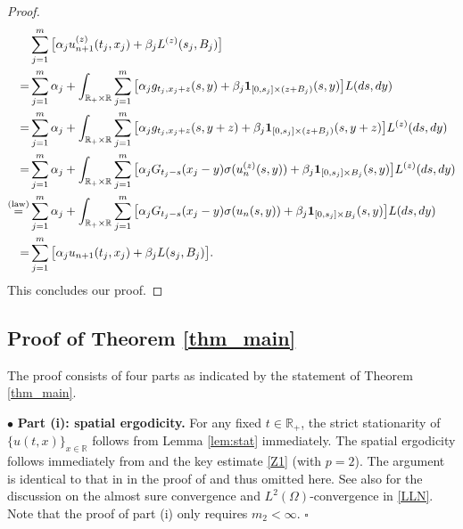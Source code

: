 \documentclass[letterpaper, 11pt,  reqno]{amsart}
\newcommand{\noi}{\noindent}
\newcommand{\R}{\mathbb{R}}
\newcommand{\bul}{\bullet}
\newcommand{\al}{\alpha}
\newcommand{\be}{\beta}
\newcommand{\s}{\sigma}
\renewcommand{\O}{\Omega}
\newcommand{\ind}{\mathbf 1}
\numberwithin{equation}{section}
\numberwithin{theorem}{section}
\begin{document}
\begin{proof}
\noi
\begin{align*}
&\sum_{j=1}^m \big[ \al_j u^{(z)}_{n+1}(t_j, x_j) + \be_j L^{(z)}(s_j, B_j) \big] \\
 =& \sum_{j=1}^m  \al_j   + \int_{\R_+\times\R}    \sum_{j=1}^m \big[  \al_j g_{t_j, x_j +z}(s,y) 
+\be_j \ind_{[0,s_j]\times (z+B_j)}(s,y) \big] L(ds, dy) \\
=&
 \sum_{j=1}^m  \al_j  + \int_{\R_+\times\R}    \sum_{j=1}^m \big[  \al_j g_{t_j, x_j +z}(s,y+z) 
+\be_j \ind_{[0,s_j]\times (z+B_j)}(s,y+z) \big] L^{(z)}(ds, dy)  \\
=&  \sum_{j=1}^m  \al_j   + \int_{\R_+\times\R}    
\sum_{j=1}^m \big[  \al_j   G_{t_j-s}( x_j -y )   \s( u_n^{(z)}(s,y) ) 
+\be_j \ind_{[0,s_j]\times B_j}(s,y) \big] L^{(z)}(ds, dy) \\
 \stackrel{{\rm (law)}}{=}  &
  \sum_{j=1}^m  \al_j   + \int_{\R_+\times\R}    
\sum_{j=1}^m \big[  \al_j   G_{t_j-s}( x_j -y )   \s( u_n(s,y) ) 
+\be_j \ind_{[0,s_j]\times B_j}(s,y) \big] L(ds, dy) \\
=& \sum_{j=1}^m \big[ \al_j u_{n+1}(t_j, x_j) + \be_j L(s_j, B_j) \big] .
\end{align*} 
This concludes our proof. 
\qedhere
\end{proof}







\subsection{Proof of Theorem \ref{thm_main}}
\label{SEC5_2}

The proof consists of four parts as indicated by the statement of Theorem \ref{thm_main}.
 

\smallskip

\noi
$\bul$  \textbf{Part (i): \textsf{spatial ergodicity}.} 
For any fixed $t\in\R_+$,
the strict stationarity of $\{u(t,x)\}_{x \in \R}$ follows from
Lemma  \ref{lem:stat} immediately. 
The spatial ergodicity follows immediately from   \cite[Lemma 4.2]{BZ23}
and the key estimate \eqref{Z1} (with $p=2$). The argument is identical to that in 
 in the proof of \cite[Theorem 1.1-(i)]{BZ23} and thus omitted here. 
 See also \cite[Remark 1.4]{BZ23} for the discussion on the almost sure convergence and 
 $L^2(\O)$-convergence in \eqref{LLN}. Note that the proof of part (i) only requires 
 $m_2 < \infty$.
 \hfill $\square$



\smallskip
\end{document}
